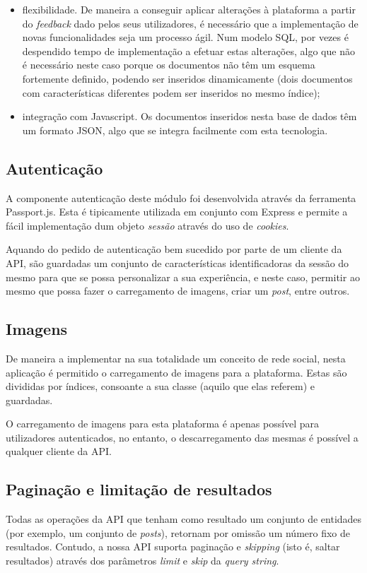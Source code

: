 \begin{itemize}
	\item flexibilidade. De maneira a conseguir aplicar alterações à plataforma a partir do \textit{feedback} dado pelos seus utilizadores, é necessário que a implementação de novas funcionalidades seja um processo ágil. Num modelo SQL, por vezes é despendido tempo de implementação a efetuar estas alterações, algo que não é necessário neste caso porque os documentos não têm um esquema fortemente definido, podendo ser inseridos dinamicamente (dois documentos com características diferentes podem ser inseridos no mesmo índice);
	\item integração com Javascript. Os documentos inseridos nesta base de dados têm um formato JSON, algo que se integra facilmente com esta tecnologia.
\end{itemize} 

\subsection{Autenticação}
A componente autenticação deste módulo foi desenvolvida através da ferramenta Passport.js. Esta é tipicamente utilizada em conjunto com Express e permite a fácil implementação dum objeto \textit{sessão} através do uso de \textit{cookies}. \par \medskip

Aquando do pedido de autenticação bem sucedido por parte de um cliente da API, são guardadas um conjunto de características identificadoras da sessão do mesmo para que se possa personalizar a sua experiência, e neste caso, permitir ao mesmo que possa fazer o carregamento de imagens, criar um \textit{post}, entre outros. \par \medskip

\subsection{Imagens}
De maneira a implementar na sua totalidade um conceito de rede social, nesta aplicação é permitido o carregamento de imagens para a plataforma. Estas são divididas por índices, consoante a sua classe (aquilo que elas referem) e guardadas. \par \medskip

O carregamento de imagens para esta plataforma é apenas possível para utilizadores autenticados, no entanto, o descarregamento das mesmas é possível a qualquer cliente da API.

\subsection{Paginação e limitação de resultados}
Todas as operações da API que tenham como resultado um conjunto de entidades (por exemplo, um conjunto de \textit{posts}), retornam por omissão um número fixo de resultados. Contudo, a nossa API suporta paginação e \textit{skipping} (isto é, saltar resultados) através dos parâmetros \textit{limit} e \textit{skip} da \textit{query string}.

